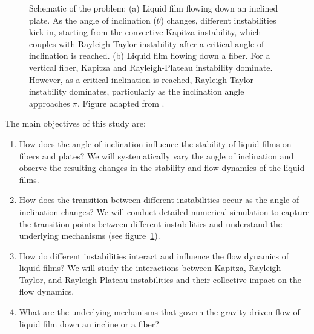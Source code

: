 \documentclass[a4paper,10pt]{article}
\begin{document}
\begin{figure}[H]
	\begin{center}
		\caption{Schematic of the problem: (a) Liquid film flowing down an inclined plate. As the angle of inclination ($\theta$) changes, different instabilities kick in, starting from the convective Kapitza instability, which couples with Rayleigh-Taylor instability after a critical angle of inclination is reached. (b) Liquid film flowing down a fiber. For a vertical fiber, Kapitza and Rayleigh-Plateau instability dominate. However,  as a critical inclination is reached, Rayleigh-Taylor instability dominates, particularly as the inclination angle approaches $\pi$. Figure adapted from \citet{rietz2017dynamics}.}
		\label{Figure::Typical}
\end{center}
\end{figure}

\noindent The main objectives of this study are:

\begin{enumerate}
	\item How does the angle of inclination influence the stability of liquid films on fibers and plates? We will systematically vary the angle of inclination and observe the resulting changes in the stability and flow dynamics of the liquid films.
	
	\item How does the transition between different instabilities occur as the angle of inclination changes? We will conduct detailed numerical simulation to capture the transition points between different instabilities and understand the underlying mechanisms (see figure~\ref{Figure::Typical}). 
	
	\item How do different instabilities interact and influence the flow dynamics of liquid films? We will study the interactions between Kapitza, Rayleigh-Taylor, and Rayleigh-Plateau instabilities and their collective impact on the flow dynamics.
	
	\item What are the underlying mechanisms that govern the gravity-driven flow of liquid film down an incline or a fiber?
		
\end{enumerate}
\end{document}
